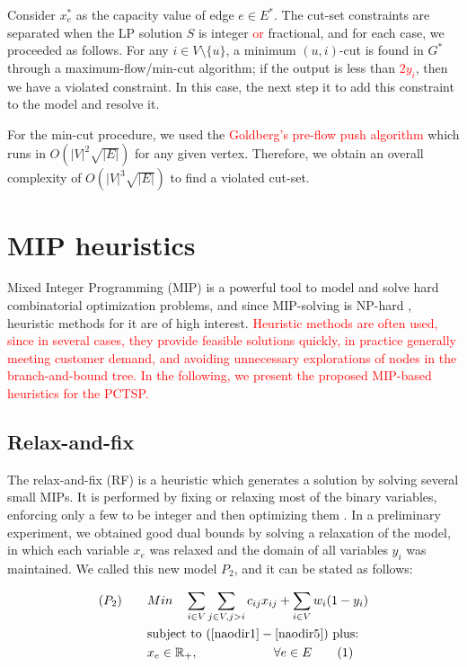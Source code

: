 \documentclass{ro}
\newcommand\numberthis{\addtocounter{equation}{1}\tag{\theequation}}
\begin{document}
Consider  $x_e^*$ as the capacity value of edge $e \in E^*$.
The cut-set constraints are separated when the LP solution $S$ is integer \textcolor{red}{or} fractional, and for each case, we proceeded as follows. For any $i \in V \setminus \{u\}$, a minimum $(u,i)$-cut is found in $G^*$ through a maximum-flow/min-cut algorithm; if the output is less than \textcolor{red}{$2y_i$}, then we have a violated constraint. In this case, the next step it to add this constraint to the model and resolve it.

For the min-cut procedure, we used the \textcolor{red}{Goldberg's pre-flow push algorithm} \cite{ciupala2008preflow} which runs in $O(|V|^2\sqrt{|E|})$ for any given vertex. Therefore, we obtain an overall complexity of $O(|V|^3\sqrt{|E|})$   to find a violated cut-set.


\section{MIP heuristics}
\label{sec:mip}
Mixed Integer Programming (MIP) is a powerful tool to model and solve hard combinatorial optimization problems, and since MIP-solving is NP-hard \cite{wolsey2014integer}, heuristic methods for it are of high interest. \textcolor{red}{Heuristic methods are often used, since in several cases, they provide feasible solutions quickly, in practice generally meeting customer demand, and avoiding unnecessary explorations of nodes in the branch-and-bound tree. In the following, we present the proposed MIP-based heuristics for the PCTSP.}

\subsection{Relax-and-fix}

The relax-and-fix (RF) is a  heuristic  which  generates  a  solution  by  solving  several small MIPs. It is performed by fixing or relaxing most of the binary variables, enforcing only a few to be integer and then optimizing them \cite{toledo2015relax}. In a preliminary experiment, we obtained good dual bounds by solving a relaxation of the model, in which each variable $x_e$  was relaxed and the domain of all  variables $y_i$ was maintained. We called this new model $P_2$, and it can be stated as follows:

\textcolor{red}{\begin{align*}
(P_2) \qquad	&Min \quad  \sum_{i \in V} \sum_{j \in V, j > i} c_{ij}x_{ij} + \sum_{i \in V} w_i (1 - y_i)  \\
&\text{subject to } (\ref{naodir1} - \ref{naodir5}) \text{ plus:}\\
	&x_e \in \mathbb{R_+}, \qquad \qquad \qquad \forall e \in E \label{xe-rl} \numberthis
\end{align*}
}
\end{document}
